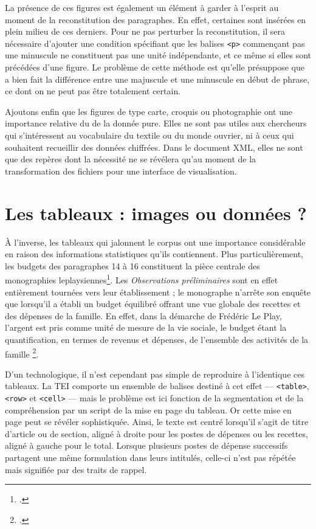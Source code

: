 La présence de ces figures est également un élément à garder à l'esprit au moment de la reconstitution des paragraphes. En effet, certaines sont insérées en plein milieu de ces derniers. Pour ne pas perturber la reconstitution, il sera nécessaire d'ajouter une condition spécifiant que les balises \texttt{<p>} commençant pas une minuscule ne constituent pas une unité indépendante, et ce même si elles sont précédées d'une figure. Le problème de cette méthode est qu'elle présuppose que \lse{} a bien fait la différence entre une majuscule et une minuscule en début de phrase, ce dont on ne peut pas être totalement certain.

Ajoutons enfin que les figures de type carte, croquis ou photographie ont une importance relative du \pov{} de la donnée pure. Elles ne sont pas utiles aux chercheurs qui s'intéressent au vocabulaire du textile ou du monde ouvrier, ni à ceux qui souhaitent recueillir des données chiffrées. Dans le document XML, elles ne sont que des repères dont la nécessité ne se révélera qu'au moment de la transformation des fichiers pour une interface de visualisation.

\section{Les tableaux : images ou données ?}

À l'inverse, les tableaux qui jalonnent le corpus ont une importance considérable en raison des informations statistiques qu'ils contiennent. Plus particulièrement, les budgets des paragraphes 14 à 16 constituent \og la pièce centrale \fg{} des monographies leplaysiennes\footcite[p. 317]{savoyecontinuateurs}. Les \textit{Observations préliminaires} sont en effet entièrement tournées vers leur établissement ; le monographe n'arrête son enquête que lorsqu'il a établi un budget équilibré offrant une vue globale des recettes et des dépenses de la famille. En effet, dans la démarche de Frédéric Le Play, \og l'argent est pris comme unité de mesure de la vie sociale, le budget étant la quantification, en termes de revenus et dépenses, de l'ensemble des activités de la famille \fg\footcite[p. 317]{savoyecontinuateurs}.

D'un \pov{} technologique, il n'est cependant pas simple de reproduire à l'identique ces tableaux. La TEI comporte un ensemble de balises destiné à cet effet --- \texttt{<table>}, \texttt{<row>} et \texttt{<cell>} --- mais le problème est ici fonction de la segmentation et de la compréhension par un script de la mise en page du tableau. Or cette mise en page peut se révéler sophistiquée. Ainsi, le texte est centré lorsqu'il s'agit de titre d'article ou de section, aligné à droite pour les postes de dépenses ou les recettes, aligné à gauche pour le total. Lorsque plusieurs postes de dépense successifs partagent une même formulation dans leurs intitulés, celle-ci n'est pas répétée mais signifiée par des traits de rappel.

